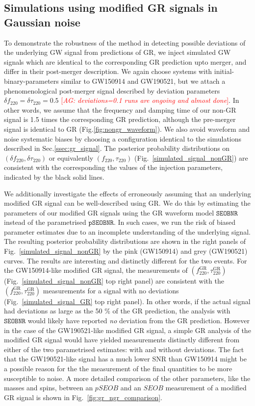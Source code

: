 \documentclass[twocolumn,prd,superscriptaddress,amsfonts,amssymb,amsmath,preprintnumbers]{revtex4-1}
\newcommand{\abhi}[1]{\textcolor{red}{[\textit{AG: #1}]}}
\newcommand{\df}[1]{\delta f_{\text{#1}}}
\newcommand{\dtau}[1]{\delta \tau_{\text{#1}}}
\newcommand{\fngr}[1]{f_{\text{#1}}}
\newcommand{\taungr}[1]{\tau_{\text{#1}}}
\newcommand{\fgr}[1]{f ^{\text{GR}}_{\text{#1}}}
\newcommand{\taugr}[1]{\tau ^{\text{GR}}_{\text{#1}}}
\newcommand{\pSEOB}{\texttt{pSEOBNR}}
\newcommand{\SEOB}{\texttt{SEOBNR}}
\begin{document}
\subsection{Simulations using modified GR signals in Gaussian noise}

To demonstrate the robustness of the method in detecting possible deviations of the underlying GW signal from predictions of GR, we inject simulated GW signals which are identical to the corresponding GR prediction upto merger, and differ in their post-merger description. We again choose systems with initial-binary-parameters similar to GW150914 and GW190521, but we attach a phenomenological post-merger signal described by deviation parameters $\df{220} = \dtau{220} = 0.5$ \abhi{deviations=0.1 runs are ongoing and almost done}. In other words, we assume that the frequency and damping time of our non-GR signal is 1.5 times the corresponding GR prediction, although the pre-merger signal is identical to GR (Fig.\ref{fig:nongr_waveform}). We also avoid waveform and noise systematic biases by choosing a configuration identical to the simulations described in Sec.\ref{ssec:gr_signal}. The posterior probability distributions on $(\df{220}, \dtau{220})$ or equivalently $(\fngr{220}, \taungr{220})$ (Fig.~\ref{simulated_signal_nonGR}) are consistent with the corresponding the values of the injection parameters, indicated by the black solid lines. 

We additionally investigate the effects of erroneously assuming that an underlying modified GR signal can be well-described using GR. We do this by estimating the parameters of our modified GR signals using the GR waveform model $\SEOB$ instead of the parametrised $\pSEOB$. In such cases, we run the risk of biased parameter estimates due to an incomplete understanding of the underlying signal. The resulting posterior probability distributions are shown in the right panels of Fig.~\ref{simulated_signal_nonGR} by the pink (GW150914) and grey (GW190521) curves. The results are interesting and distinctly different for the two events. For the GW150914-like modified GR signal, the measurements of $(\fgr{220}, \taugr{220})$ (Fig.~\ref{simulated_signal_nonGR} top right panel) are consistent with the $(\fgr{220}, \taugr{220})$ measurements for a signal with no deviations (Fig.~\ref{simulated_signal_GR} top right panel). In other words, if the actual signal had deviations as large as the 50 \% of the GR prediction, the analysis with $\SEOB$ would likely have reported \emph{no} deviation from the GR prediction. However in the case of the GW190521-like modified GR signal, a simple GR analysis of the modified GR signal would have yielded measurements distinctly different from either of the two parametrised estimates: with and without deviations. The fact that the GW190521-like signal has a much lower SNR than GW150914 might be a possible reason for the the measurement of the final quantities to be more susceptible to noise. A more detailed comparison of the other parameters, like the masses and spins, between an $pSEOB$ and an $SEOB$ measurement of a modified GR signal is shown in Fig.~\ref{fig:gr_ngr_comparison}.
\end{document}
